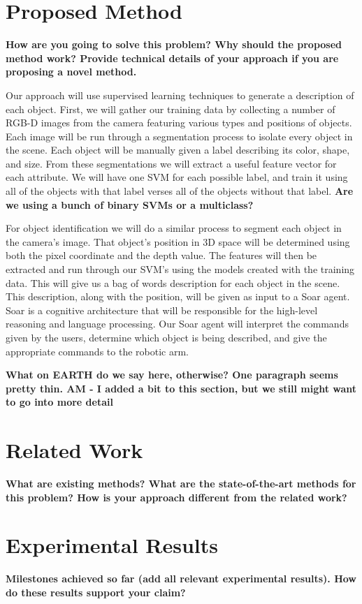 \documentclass[11pt]{article}
\newcommand{\xxx}[1]{{\bf \color{red} #1}}
\newcommand{\meh}[1]{{\bf \color{blue} #1}}
\begin{document}
\section{Proposed Method}
\xxx{How are you going to solve this problem? Why should the proposed method
    work? Provide technical details of your approach if you are proposing a
    novel method.}

Our approach will use supervised learning techniques to generate a description of each object. First, we will gather our training data by collecting a number of RGB-D images from the camera featuring various types and positions of objects. Each image will be run through a segmentation process to isolate every object in the scene. Each object will be manually given a label describing its color, shape, and size. From these segmentations we will extract a useful feature vector for each attribute. We will have one SVM for each possible label, and train it using all of the objects with that label verses all of the objects without that label. \meh{Are we using a bunch of binary SVMs or a multiclass?}

For object identification we will do a similar process to segment each object in the camera's image. That object's position in 3D space will be determined using both the pixel coordinate and the depth value. The features will then be extracted and run through our SVM's using the models created with the training data. This will give us a bag of words description for each object in the scene. This description, along with the position, will be given as input to a Soar agent. Soar is a cognitive architecture that will be responsible for the high-level reasoning and language processing. Our Soar agent will interpret the commands given by the users, determine which object is being described, and give the appropriate commands to the robotic arm. 



\xxx{What on EARTH do we say here, otherwise? One paragraph seems pretty
    thin. AM - I added a bit to this section, but we still might want to go into more detail}

\section{Related Work}
\xxx{What are existing methods? What are the state-of-the-art methods for this
    problem? How is your approach different from the related work?}

\section{Experimental Results}
\xxx{Milestones achieved so far (add all relevant experimental results). How
    do these results support your claim?}
\end{document}
